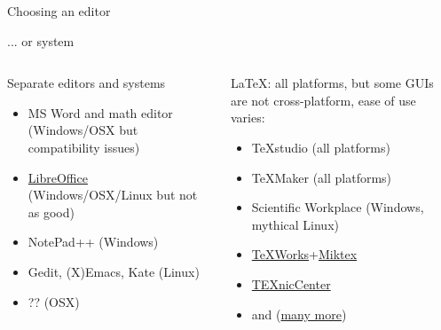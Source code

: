 \documentclass[xcolor=table,compress]{beamer}
\begin{document}
\begin{frame}{Choosing an editor}
\begin{block}{... or system}
\begin{columns}[t]
\begin{column}{.48\textwidth}
\color{red}
Separate editors and systems 
\begin{itemize}
\item MS Word and math editor (Windows/OSX but compatibility issues)
\item \href{http://www.libreoffice.org}{LibreOffice} (Windows/OSX/Linux but not as good)
\item NotePad++ (Windows)
\item Gedit, (X)Emacs, Kate (Linux)
\item ?? (OSX)
\end{itemize}
\end{column}
\hfill
\begin{column}{.48\textwidth}
{\color{red}
\LaTeX}: all platforms, but some GUIs are not cross-platform, ease of use varies:
\begin{itemize}
\item TeXstudio (all platforms)
\item TeXMaker (all platforms)
\item Scientific Workplace (Windows, mythical Linux) 
\item \href{http://www.tug.org/texworks/}{TeXWorks}+\href{http://miktex.org/}{Miktex}
\item \href{http://www.texniccenter.org/}{TEXnicCenter}
\item and  (\href{http://alternativeto.net/software/texmaker/}{many more})
\end{itemize}
\end{column}
\end{columns}
\end{block}
\end{frame}
\end{document}
